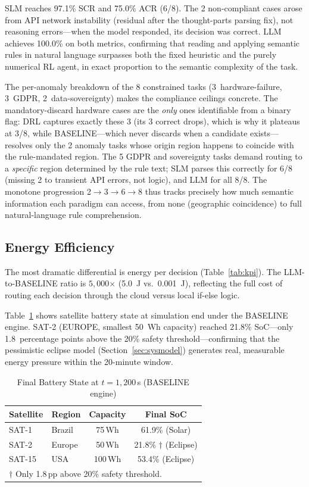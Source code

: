 \documentclass[conference,comsoc,twoside,caption=false]{IEEEtran}
\let\MYoriglatexcaption\caption
\renewcommand{\caption}[2][\relax]{\MYoriglatexcaption[#2]{#2}}
\theoremstyle{definition}
\begin{document}
SLM reaches 97.1\% SCR and
75.0\% ACR (6/8). The 2 non-compliant cases arose
from API network instability (residual after the thought-parts parsing fix),
not reasoning errors---when the model responded, its decision was correct. LLM
achieves 100.0\% on both metrics, confirming that
reading and applying semantic rules in natural language surpasses both the fixed
heuristic and the purely numerical RL agent, in exact proportion to the semantic
complexity of the task.

The per-anomaly breakdown of the 8 constrained tasks (3~hardware-failure,
3~GDPR, 2~data-sovereignty) makes the compliance ceilings concrete. The
mandatory-discard hardware cases are the \emph{only} ones identifiable from a
binary flag: DRL captures exactly these 3 (its 3 correct drops), which is why it
plateaus at 3/8, while BASELINE---which never discards when a candidate
exists---resolves only the 2 anomaly tasks whose origin region happens to
coincide with the rule-mandated region. The 5 GDPR and sovereignty tasks demand
routing to a \emph{specific} region determined by the rule text; SLM parses this
correctly for 6/8 (missing 2 to transient API errors, not logic), and LLM for
all 8/8. The monotone progression 2$\rightarrow$3$\rightarrow$6$\rightarrow$8
thus tracks precisely how much semantic information each paradigm can access,
from none (geographic coincidence) to full natural-language rule comprehension.

\subsection{Energy Efficiency}

The most dramatic differential is energy per decision (Table~\ref{tab:kpi}).
The LLM-to-BASELINE ratio is $5{,}000$$\times$
(5.0~J vs.\ 0.001~J), reflecting
the full cost of routing each decision through the cloud versus local if-else
logic.

Table~\ref{tab:battery} shows satellite battery state at simulation end under
the BASELINE engine. SAT-2 (EUROPE, smallest 50~Wh capacity) reached
21.8\% \ac{SoC}---only 1.8~percentage points above the
20\% safety threshold---confirming that the pessimistic eclipse model
(Section~\ref{sec:sysmodel}) generates real, measurable energy pressure within
the 20-minute window.

\begin{table}[!t]
\centering
\caption{Final Battery State at $t = 1{,}200$\,s (BASELINE engine)}
\label{tab:battery}
\footnotesize
\begin{tabular}{llcc}
\toprule
\textbf{Satellite} & \textbf{Region} & \textbf{Capacity} & \textbf{Final SoC} \\
\midrule
SAT-1  & Brazil & 75\,Wh  & 61.9\% (Solar) \\
SAT-2  & Europe & 50\,Wh  & 21.8\% $\dagger$ (Eclipse) \\
SAT-15 & USA    & 100\,Wh & 53.4\% (Eclipse) \\
\bottomrule
\multicolumn{4}{l}{\footnotesize$\dagger$ Only 1.8\,pp above 20\% safety threshold.}
\end{tabular}
\end{table}
\end{document}
